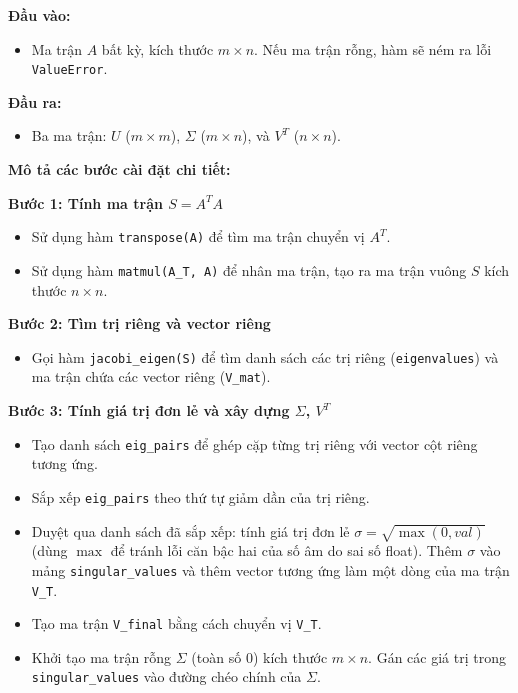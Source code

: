 \documentclass[a4paper]{article}
\begin{document}
\textbf{Đầu vào: }
\begin{itemize}
    \item Ma trận $A$ bất kỳ, kích thước $m \times n$. Nếu ma trận rỗng, hàm sẽ ném ra lỗi \texttt{ValueError}.
\end{itemize}

\textbf{Đầu ra: }
\begin{itemize}
    \item Ba ma trận: $U$ ($m \times m$), $\Sigma$ ($m \times n$), và $V^T$ ($n \times n$).
\end{itemize}

\textbf{Mô tả các bước cài đặt chi tiết:}

\textbf{Bước 1: Tính ma trận $S = A^T A$}
\begin{itemize}
    \item Sử dụng hàm \texttt{transpose(A)} để tìm ma trận chuyển vị $A^T$.
    \item Sử dụng hàm \texttt{matmul(A\_T, A)} để nhân ma trận, tạo ra ma trận vuông $S$ kích thước $n \times n$.
\end{itemize}

\textbf{Bước 2: Tìm trị riêng và vector riêng}
\begin{itemize}
    \item Gọi hàm \texttt{jacobi\_eigen(S)} để tìm danh sách các trị riêng (\texttt{eigenvalues}) và ma trận chứa các vector riêng (\texttt{V\_mat}).
\end{itemize}

\textbf{Bước 3: Tính giá trị đơn lẻ và xây dựng $\Sigma$, $V^T$}
\begin{itemize}
    \item Tạo danh sách \texttt{eig\_pairs} để ghép cặp từng trị riêng với vector cột riêng tương ứng.
    \item Sắp xếp \texttt{eig\_pairs} theo thứ tự giảm dần của trị riêng.
    \item Duyệt qua danh sách đã sắp xếp: tính giá trị đơn lẻ $\sigma = \sqrt{\max(0, val)}$ (dùng $\max$ để tránh lỗi căn bậc hai của số âm do sai số float). Thêm $\sigma$ vào mảng \texttt{singular\_values} và thêm vector tương ứng làm một dòng của ma trận \texttt{V\_T}.
    \item Tạo ma trận \texttt{V\_final} bằng cách chuyển vị \texttt{V\_T}.
    \item Khởi tạo ma trận rỗng $\Sigma$ (toàn số 0) kích thước $m \times n$. Gán các giá trị trong \texttt{singular\_values} vào đường chéo chính của $\Sigma$.
\end{itemize}
\end{document}
